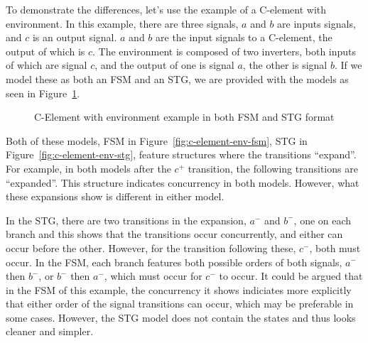 To demonstrate the differences, let's use the example of a C-element with environment. In this example, there are three signals, 
$a$ and $b$ are inputs signals, and $c$ is an output signal. $a$ and $b$ are the input signals to a C-element, the output of which is $c$. 
The environment is composed of two inverters, both inputs of which are signal $c$, and the output of one is signal $a$, the other is signal $b$. 
If we model these as both an FSM and an STG, we are provided with the models as seen in Figure~\ref{fig:c-element-env}.

\begin{figure}[H]
\centering
{}
  \caption{\label{fig:c-element-env} C-Element with environment example in both FSM and STG format}
\end{figure}

Both of these models, FSM in Figure~\ref{fig:c-element-env-fsm}, STG in Figure~\ref{fig:c-element-env-stg}, feature structures 
where the transitions ``expand''. For example, in both models after the $c^{+}$ transition, the following transitions are ``expanded''. 
This structure indicates concurrency in both models. However, what these expansions show is different in either model. 

In the STG, there are two transitions in the expansion, $a^{-}$ and $b^{-}$, one on each branch and this shows that the transitions
 occur concurrently, and either can occur before the other. However, for the transition following these, $c^{-}$, both must occur.
In the FSM, each branch features both possible orders of both signals, $a^{-}$ then $b^{-}$, or $b^{-}$ then $a^{-}$, which must occur
for $c^{-}$ to occur. It could be argued that in the FSM of this example, the concurrency it shows indiciates more explicitly that either order of the
signal transitions can occur, which may be preferable in some cases. However, the STG model does not contain the states and thus looks
cleaner and simpler.

